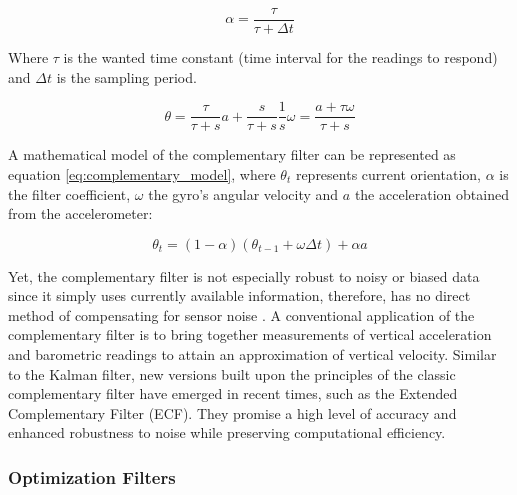 \begin{equation}
  \alpha = \frac{\tau}{\tau + \Delta t}
\end{equation}

Where $\tau$ is the wanted time constant (time interval for the readings to respond) and $\Delta t$ is the sampling period.

\begin{equation}
  \theta = \frac{\tau}{\tau + s}a + \frac{s}{\tau + s}\frac{1}{s}\omega = \frac{a+\tau \omega}{\tau + s}
\end{equation}

A mathematical model of the complementary filter can be represented as equation \ref{eq:complementary_model}, where $\theta_t$ represents current orientation, $\alpha$ is the filter coefficient, $\omega$ the gyro's angular velocity and $a$ the acceleration obtained from the accelerometer:

\begin{equation}
  \theta_t = (1 - \alpha) (\theta_{t-1} + \omega \Delta t) + \alpha a
  \label{eq:complementary_model}
\end{equation}

Yet, the complementary filter is not especially robust to noisy or biased data since it simply uses currently available information, therefore, has no direct method of compensating for sensor noise \cite{wilson2019formulation}. A conventional application of the complementary filter is to bring together measurements of vertical acceleration and barometric readings to attain an approximation of vertical velocity. Similar to the Kalman filter, new versions built upon the principles of the classic complementary filter have emerged in recent times, such as the Extended Complementary Filter (ECF). They promise a high level of accuracy and enhanced robustness to noise while preserving computational efficiency.

\subsubsection{Optimization Filters}

